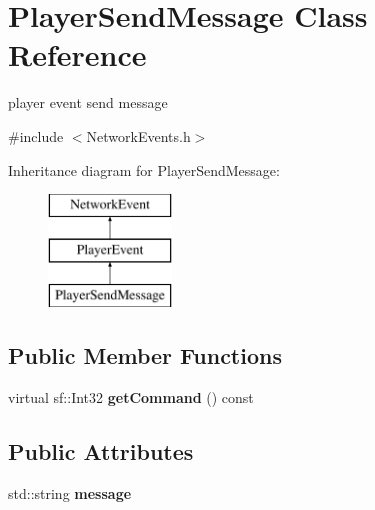\hypertarget{class_player_send_message}{\section{Player\-Send\-Message Class Reference}
\label{class_player_send_message}
}


player event send message  




{\ttfamily \#include $<$Network\-Events.\-h$>$}

Inheritance diagram for Player\-Send\-Message\-:\begin{figure}[H]
\begin{center}
\leavevmode
\includegraphics[height=3.000000cm]{class_player_send_message}
\end{center}
\end{figure}
\subsection*{Public Member Functions}
\begin{DoxyCompactItemize}
\item 
\hypertarget{class_player_send_message_a982d585bbc44d7bb2ca0a866654e19fe}{virtual sf\-::\-Int32 {\bfseries get\-Command} () const }\label{class_player_send_message_a982d585bbc44d7bb2ca0a866654e19fe}

\end{DoxyCompactItemize}
\subsection*{Public Attributes}
\begin{DoxyCompactItemize}
\item 
\hypertarget{class_player_send_message_aed484c51804e0df83dd59a162fd62b33}{std\-::string {\bfseries message}}\label{class_player_send_message_aed484c51804e0df83dd59a162fd62b33}

\end{DoxyCompactItemize}
